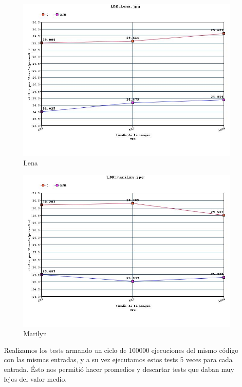 \begin{figure}
  \begin{center}
	\includegraphics[scale=0.66]{imagenes/ldr-lena.jpg}
	\caption{Lena}
	\label{Lena}
  \end{center}
\end{figure}

\begin{figure}
  \begin{center}
	\includegraphics[scale=0.66]{imagenes/ldr-marilyn.jpg}
	\caption{Marilyn}
	\label{Marilyn}
  \end{center}
\end{figure}

Realizamos los tests armando un ciclo de 100000 ejecuciones del mismo c\'odigo con las mismas entradas, y a su vez ejecutamos estos tests 5 veces para cada entrada. \'Esto nos 
permiti\'o hacer promedios y descartar tests que daban muy lejos del valor medio.

